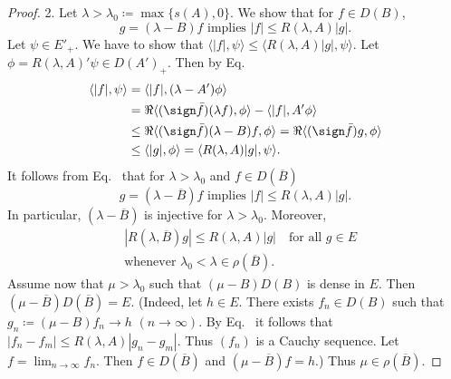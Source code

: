 \begin{proof}
2. Let $\lambda > \lambda_{0} \coloneq \max\{s(A),0\}$. 
We show that for $f \in D(B)$,
\begin{equation}\label{eq:c2-4.6}
g = (\lambda - B)f \text{ implies } |f| \leq R(\lambda,A)|g|.
\end{equation}
Let $\psi \in E'_{+}$. 
We have to show that 
$\langle|f|,\psi\rangle \leq \langle R(\lambda,A)|g|,\psi\rangle$.
Let $\phi = R(\lambda,A)'\psi \in D(A')_{+}$. 
Then by Eq.~
\begin{align*}
\langle|f|,\psi\rangle &= \langle|f|, (\lambda - A')\phi\rangle \\
&= \Re\langle(\sign  \bar{f})(\lambda f),\phi\rangle - \langle|f|,A'\phi\rangle\\
&\leq \Re\langle(\sign  \bar{f})(\lambda - B)f,\phi\rangle = \Re\langle(\sign  \bar{f})g,\phi\rangle\\
&\leq \langle|g|,\phi\rangle = \langle R(\lambda,A)|g|,\psi\rangle.
\end{align*}
It follows from Eq.~ that for $\lambda > \lambda_{0}$ and $f \in D(\overline{B})$
\begin{equation}\label{eq:c2-4.7}
g = (\lambda - \overline{B})f \text{ implies } |f| \leq R(\lambda,A)|g|.
\end{equation}
In particular, $(\lambda - \overline{B})$ is injective for $\lambda > \lambda_{0}$. 
Moreover,
\begin{equation}\label{eq:c2-4.8}
\begin{split}
&|R(\lambda,\overline{B})g| \leq R(\lambda,A)|g| \quad \text{for all } g \in E\\
&\text{whenever } \lambda_{0} < \lambda \in \rho(\overline{B}).
\end{split}
\end{equation}
Assume now that $\mu > \lambda_{0}$ such that $(\mu - B)D(B)$ is dense in $E$. 
Then 
$(\mu - \overline{B})D(\overline{B}) = E$. 
(Indeed, let $h \in E$. 
There exists $f_{n} \in D(B)$ such that $g_{n} \coloneq (\mu - B)f_{n} \to h$ $(n \to \infty)$. 
By Eq.~ it follows that $|f_{n} - f_{m}| \leq R(\lambda,A)|g_{n} - g_{m}|$. 
Thus $(f_{n})$ is a Cauchy sequence. 
Let $f = \lim_{n \to \infty} f_{n}$. 
Then $f \in D(\overline{B})$ and $(\mu - \overline{B})f = h$.) 
Thus $\mu \in \rho(\overline{B})$.


\end{proof}

